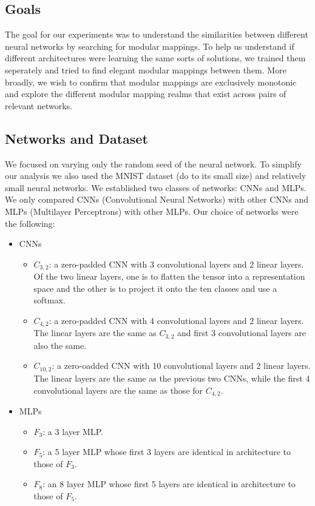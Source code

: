 \documentclass{article} %
\begin{document}
\subsection{Goals}
The goal for our experiments was to understand the similarities between different neural networks by searching
for modular mappings. To help us understand if different architectures were learning the same sorts of solutions,
we trained them seperately and tried to find elegant modular mappings between them. More broadly, we wish to confirm
that modular mappings are exclusively monotonic and explore the different modular mapping realms that exist across pairs
of relevant networks.

\subsection{Networks and Dataset}
We focused on varying only the random seed of the neural network. To simplify our analysis we also used the MNIST dataset
(do to its small size) and relatively small neural networks. We established two classes of networks: CNNs and MLPs.
We only compared CNNs (Convolutional Neural Networks) with other CNNs and MLPs (Multilayer Perceptrons) with other MLPs.
Our choice of networks were the following:
\begin{itemize}
   \item CNNs
   \begin{itemize}
      \item \(C_{3,2}\): a zero-padded CNN with 3 convolutional layers and 2 linear layers. Of the two linear layers, one is to flatten the tensor into a representation space and the other is to project it onto the ten classes and use a softmax.
      \item \(C_{4,2}\): a zero-padded CNN with 4 convolutional layers and 2 linear layers. The linear layers are the same as \(C_{3,2}\) and first 3 convolutional layers are also the same.
      \item \(C_{10,2}\): a zero-oadded CNN with 10 convolutional layers and 2 linear layers. The linear layers are the same as the previous two CNNs, while the first 4 convolutional layers are the same as those for \(C_{4,2}\).
   \end{itemize}
   \item MLPs
   \begin{itemize}
      \item \(F_{3}\): a 3 layer MLP.
      \item \(F_{5}\): a 5 layer MLP whose first 3 layers are identical in architecture to those of \(F_{3}\).
      \item \(F_{8}\): an 8 layer MLP whose first 5 layers are identical in architecture to those of \(F_{5}\).
   \end{itemize}
\end{itemize}
\end{document}
